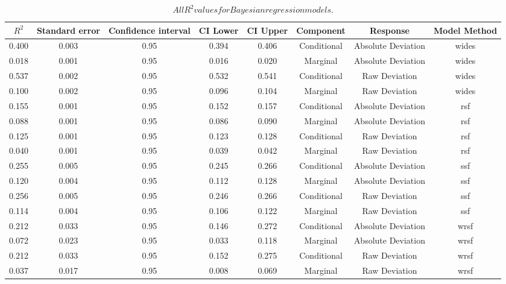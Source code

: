 \documentclass[10pt,a4paper]{article}
\begin{document}
\begin{table}

\caption{\label{tab:r2table}$All R^2 values for Bayesian regression models.$}
\centering
\begin{tabular}[t]{c|c|c|c|c|c|c|c}
\hline
\textit{$R^2$} & Standard error & Confidence interval & CI Lower & CI Upper & Component & Response & Model Method\\
\hline
0.400 & 0.003 & 0.95 & 0.394 & 0.406 & Conditional & Absolute Deviation & wides\\
\hline
0.018 & 0.001 & 0.95 & 0.016 & 0.020 & Marginal & Absolute Deviation & wides\\
\hline
0.537 & 0.002 & 0.95 & 0.532 & 0.541 & Conditional & Raw Deviation & wides\\
\hline
0.100 & 0.002 & 0.95 & 0.096 & 0.104 & Marginal & Raw Deviation & wides\\
\hline
0.155 & 0.001 & 0.95 & 0.152 & 0.157 & Conditional & Absolute Deviation & rsf\\
\hline
0.088 & 0.001 & 0.95 & 0.086 & 0.090 & Marginal & Absolute Deviation & rsf\\
\hline
0.125 & 0.001 & 0.95 & 0.123 & 0.128 & Conditional & Raw Deviation & rsf\\
\hline
0.040 & 0.001 & 0.95 & 0.039 & 0.042 & Marginal & Raw Deviation & rsf\\
\hline
0.255 & 0.005 & 0.95 & 0.245 & 0.266 & Conditional & Absolute Deviation & ssf\\
\hline
0.120 & 0.004 & 0.95 & 0.112 & 0.128 & Marginal & Absolute Deviation & ssf\\
\hline
0.256 & 0.005 & 0.95 & 0.246 & 0.266 & Conditional & Raw Deviation & ssf\\
\hline
0.114 & 0.004 & 0.95 & 0.106 & 0.122 & Marginal & Raw Deviation & ssf\\
\hline
0.212 & 0.033 & 0.95 & 0.146 & 0.272 & Conditional & Absolute Deviation & wrsf\\
\hline
0.072 & 0.023 & 0.95 & 0.033 & 0.118 & Marginal & Absolute Deviation & wrsf\\
\hline
0.212 & 0.033 & 0.95 & 0.152 & 0.275 & Conditional & Raw Deviation & wrsf\\
\hline
0.037 & 0.017 & 0.95 & 0.008 & 0.069 & Marginal & Raw Deviation & wrsf\\
\hline
\end{tabular}
\end{table}
\end{document}
